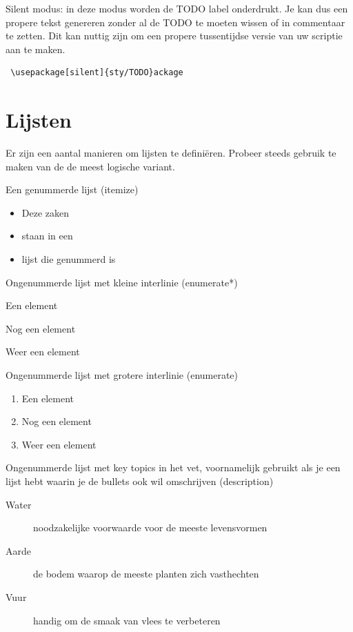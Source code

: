 Silent modus: in deze modus worden de TODO label onderdrukt. 
Je kan dus een propere tekst genereren zonder al de TODO te moeten wissen of in commentaar te zetten. 
Dit kan nuttig zijn om een propere tussentijdse versie van uw scriptie aan te maken.
\begin{verbatim}
 \usepackage[silent]{sty/TODO}ackage 
\end{verbatim}

\section{Lijsten}

Er zijn een aantal manieren om lijsten te defini\"eren. Probeer steeds gebruik te maken van de de meest logische variant.

Een genummerde lijst (itemize)

\begin{itemize}
  \item Deze zaken
  \item staan in een
  \item lijst die genummerd is
\end{itemize}

Ongenummerde lijst met kleine interlinie (enumerate*)

\begin{enumerate*}
  \item Een element
  \item Nog een element
  \item Weer een element
\end{enumerate*}

Ongenummerde lijst met grotere interlinie (enumerate)

\begin{enumerate}
  \item Een element
  \item Nog een element
  \item Weer een element
\end{enumerate}

Ongenummerde lijst met key topics in het vet, voornamelijk gebruikt als je een lijst hebt waarin je de bullets ook wil omschrijven (description)

\begin{description}
  \item [Water] noodzakelijke voorwaarde voor de meeste levensvormen
  \item [Aarde] de bodem waarop de meeste planten zich vasthechten
  \item [Vuur] handig om de smaak van vlees te verbeteren
\end{description}



